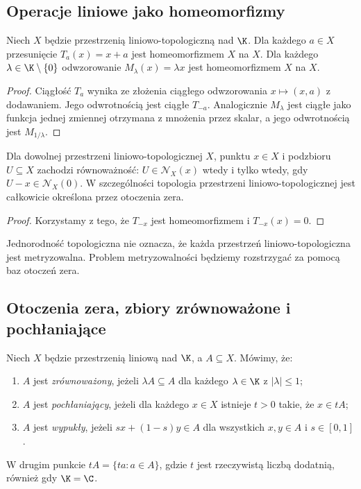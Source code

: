 \subsection{Operacje liniowe jako homeomorfizmy}

\begin{stwierdzenie}\label{prop:translation}
Niech $X$ będzie przestrzenią liniowo-topologiczną nad $\K$.
Dla każdego $a\in X$ przesunięcie $T_a(x)=x+a$ jest
homeomorfizmem $X$ na $X$. Dla każdego $\lambda\in\K\setminus\{0\}$
odwzorowanie $M_\lambda(x)=\lambda x$ jest homeomorfizmem $X$ na $X$.
\end{stwierdzenie}
\begin{proof}
Ciągłość $T_a$ wynika ze złożenia ciągłego odwzorowania
$x\mapsto(x,a)$ z dodawaniem. Jego odwrotnością jest ciągłe $T_{-a}$.
Analogicznie $M_\lambda$ jest ciągłe jako funkcja jednej zmiennej
otrzymana z mnożenia przez skalar, a jego odwrotnością jest
$M_{1/\lambda}$.
\end{proof}

\begin{wniosek}\label{cor:zero-neighborhood}
Dla dowolnej przestrzeni liniowo-topologicznej $X$, punktu $x\in X$
i podzbioru $U\subseteq X$ zachodzi równoważność:
$U\in\mathcal N_X(x)$ wtedy i tylko wtedy, gdy
$U-x\in\mathcal N_X(0)$. W szczególności topologia przestrzeni
liniowo-topologicznej jest całkowicie określona przez otoczenia zera.
\end{wniosek}
\begin{proof}
Korzystamy z tego, że $T_{-x}$ jest homeomorfizmem i
$T_{-x}(x)=0$.
\end{proof}

\begin{uwaga}
Jednorodność topologiczna nie oznacza, że każda przestrzeń
liniowo-topologiczna jest metryzowalna. Problem metryzowalności
będziemy rozstrzygać za pomocą baz otoczeń zera.
\end{uwaga}

\subsection{Otoczenia zera, zbiory zrównoważone i pochłaniające}

\begin{definicja}\label{def:balanced-absorbing}
Niech $X$ będzie przestrzenią liniową nad $\K$, a $A\subseteq X$.
Mówimy, że:
\begin{enumerate}[label=\textup{(\roman*)}]
 \item $A$ jest \emph{zrównoważony}, jeżeli $\lambda A\subseteq A$
       dla każdego $\lambda\in\K$ z $|\lambda|\leq1$;
 \item $A$ jest \emph{pochłaniający}, jeżeli dla każdego $x\in X$
       istnieje $t>0$ takie, że $x\in tA$;
 \item $A$ jest \emph{wypukły}, jeżeli $sx+(1-s)y\in A$
       dla wszystkich $x,y\in A$ i $s\in[0,1]$.
\end{enumerate}
W drugim punkcie $tA=\{ta:a\in A\}$, gdzie $t$ jest rzeczywistą
liczbą dodatnią, również gdy $\K=\C$.
\end{definicja}

